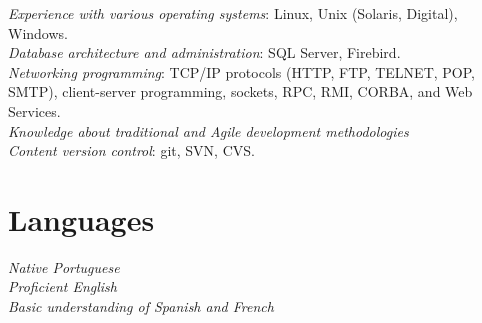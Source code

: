 \documentclass[10pt]{article} %
\begin{document}

{
\textit{Experience with various operating systems}: Linux, Unix (Solaris, Digital), Windows. \\
\textit{Database architecture and administration}: SQL Server, Firebird. \\
\textit{Networking programming}: TCP/IP protocols (HTTP, FTP, TELNET, POP, SMTP), client-server programming, sockets, RPC, RMI, CORBA, and Web Services. \\
\textit{Knowledge about traditional and Agile development methodologies} \\
\textit{Content version control}: git, SVN, CVS. \\
}


\section{Languages}

\textit{Native Portuguese} \\
\textit{Proficient English} \\
\textit{Basic understanding of Spanish and French} \\
\end{document}
